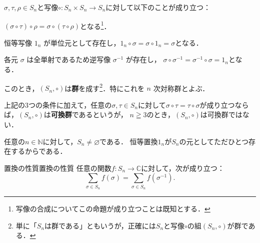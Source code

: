 \begin{mycolumn}
$\sigma, \tau, \rho \in S_n$と写像$\circ \colon S_n \times S_n \to S_n$に対して以下のことが成り立つ：
  
  \begin{description}[align=left,labelwidth=6em]
    \item[結合律] $(\sigma \circ \tau) \circ \rho = \sigma \circ (\tau \circ \rho) $となる\footnote{写像の合成についてこの命題が成り立つことは既知とする．}．\label{item:結合律}
    
    \item[単位元の存在] 恒等写像 $1_n$ が単位元として存在し，$1_n \circ \sigma = \sigma \circ 1_n = \sigma $となる．\label{item:単位元の存在}
    
    \item[逆元の存在] 各元 $\sigma$ は全単射であるため逆写像 $\sigma^{-1}$ が存在し，
    $\sigma \circ \sigma ^{-1} = \sigma ^{-1} \circ \sigma = 1_n $となる．\label{item:逆元の存在}
  \end{description}
  
  このとき，$(S_n,\circ)$は\textbf{群}を成す\footnote{単に「$S_n$は群である」ともいうが，正確には$S_n$と写像$\circ$の組$(S_n,\circ)$が群である．}．特にこれを $n$ 次対称群とよぶ．

   上記の3つの条件に加えて，任意の$\sigma, \tau \in S_n$に対して$\sigma \circ \tau = \tau \circ \sigma $が成り立つならば，$(S_n,\circ)$は\textbf{可換群}であるというが，
  $n \geqq 3$のとき，$(S_n,\circ)$は可換群ではない．
  \end{mycolumn}

\begin{mycolumn}
  任意の$n \in \mathbb{N}$に対して，$S_n \ne \varnothing$である．
  恒等置換$1_n$が$S_n$の元としてただひとつ存在するからである．
\end{mycolumn}

\begin{prop}{置換の性質}{置換の性質}
  任意の関数$ f \colon S_n \to \mathbb{C} $に対して，次が成り立つ：
  \[
  \sum_{\sigma \in S_n} f(\sigma) = \sum_{\sigma \in S_n} f(\sigma^{-1}).
  \]
\end{prop}

